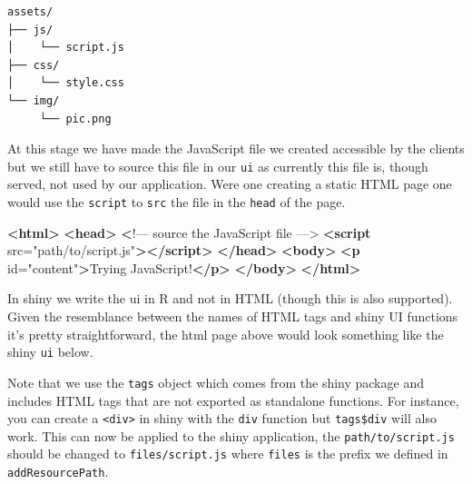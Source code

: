 \documentclass[
]{krantz}
\makeatletter
\newenvironment{Shaded}{\begin{snugshade}}{\end{snugshade}}
\newcommand{\DataTypeTok}[1]{\textcolor[rgb]{0.27,0.27,0.27}{#1}}
\newcommand{\ErrorTok}[1]{\textcolor[rgb]{0.14,0.14,0.14}{\textbf{#1}}}
\newcommand{\KeywordTok}[1]{\textcolor[rgb]{0.27,0.27,0.27}{\textbf{#1}}}
\newcommand{\NormalTok}[1]{#1}
\newcommand{\OperatorTok}[1]{\textcolor[rgb]{0.43,0.43,0.43}{\textbf{#1}}}
\newcommand{\OtherTok}[1]{\textcolor[rgb]{0.37,0.37,0.37}{#1}}
\newcommand{\StringTok}[1]{\textcolor[rgb]{0.5,0.5,0.5}{#1}}
\newenvironment{kframe}{%
\medskip{}
\setlength{\fboxsep}{.8em}
 \def\at@end@of@kframe{}%
 \ifinner\ifhmode%
  \def\at@end@of@kframe{\end{minipage}}%
  \begin{minipage}{\columnwidth}%
 \fi\fi%
 \def\FrameCommand##1{\hskip\@totalleftmargin \hskip-\fboxsep
 \colorbox{shadecolor}{##1}\hskip-\fboxsep
     \hskip-\linewidth \hskip-\@totalleftmargin \hskip\columnwidth}%
 \MakeFramed {\advance\hsize-\width
   \@totalleftmargin\z@ \linewidth\hsize
   \@setminipage}}%
 {\par\unskip\endMakeFramed%
 \at@end@of@kframe}
\renewenvironment{Shaded}{\begin{kframe}}{\end{kframe}}
\makeatother
\begin{document}
\begin{verbatim}
assets/
├── js/
│    └── script.js
├── css/
│    └── style.css
└── img/
     └── pic.png
\end{verbatim}

At this stage we have made the JavaScript file we created accessible by the clients but we still have to source this file in our \texttt{ui} as currently this file is, though served, not used by our application. Were one creating a static HTML page one would use the \texttt{script} to \texttt{src} the file in the \texttt{head} of the page.

\begin{Shaded}
\begin{Highlighting}[]
\KeywordTok{<html>}
  \KeywordTok{<head>}
    \ErrorTok{<}\NormalTok{!–– source the JavaScript file ––>}
    \KeywordTok{<script}\OtherTok{ src=}\StringTok{"path/to/script.js"}\KeywordTok{></script>}
  \KeywordTok{</head>}
  \KeywordTok{<body>}
    \KeywordTok{<p}\OtherTok{ id=}\StringTok{"content"}\KeywordTok{>}\NormalTok{Trying JavaScript!}\KeywordTok{</p>}
  \KeywordTok{</body>}
\KeywordTok{</html>}
\end{Highlighting}
\end{Shaded}

In shiny we write the ui in R and not in HTML (though this is also supported). Given the resemblance between the names of HTML tags and shiny UI functions it's pretty straightforward, the html page above would look something like the shiny \texttt{ui} below.

\begin{Shaded}
\end{Shaded}

Note that we use the \texttt{tags} object which comes from the shiny package and includes HTML tags that are not exported as standalone functions. For instance, you can create a \texttt{\textless{}div\textgreater{}} in shiny with the \texttt{div} function but \texttt{tags\$div} will also work. This can now be applied to the shiny application, the \texttt{path/to/script.js} should be changed to \texttt{files/script.js} where \texttt{files} is the prefix we defined in \texttt{addResourcePath}.
\end{document}
